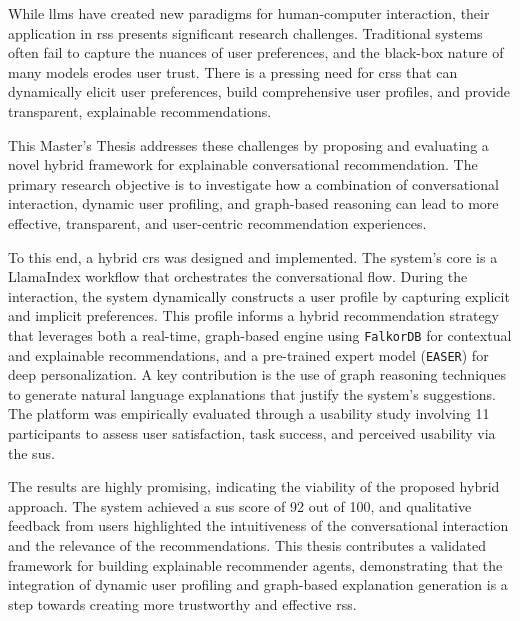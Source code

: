 
While \acp{llm} have created new paradigms for human-computer interaction, their application in \acp{rs} presents significant research challenges. Traditional systems often fail to capture the nuances of user preferences, and the black-box nature of many models erodes user trust. There is a pressing need for \aclp{crs} that can dynamically elicit user preferences, build comprehensive user profiles, and provide transparent, explainable recommendations.

This Master's Thesis addresses these challenges by proposing and evaluating a novel hybrid framework for explainable conversational recommendation. The primary research objective is to investigate how a combination of conversational interaction, dynamic user profiling, and graph-based reasoning can lead to more effective, transparent, and user-centric recommendation experiences.

To this end, a hybrid \acl{crs} was designed and implemented. The system's core is a LlamaIndex workflow that orchestrates the conversational flow. During the interaction, the system dynamically constructs a user profile by capturing explicit and implicit preferences. This profile informs a hybrid recommendation strategy that leverages both a real-time, graph-based engine using \texttt{FalkorDB} for contextual and explainable recommendations, and a pre-trained expert model (\texttt{EASER}) for deep personalization. A key contribution is the use of graph reasoning techniques to generate natural language explanations that justify the system's suggestions. The platform was empirically evaluated through a usability study involving 11 participants to assess user satisfaction, task success, and perceived usability via the \ac{sus}.

The results are highly promising, indicating the viability of the proposed hybrid approach. The system achieved a \acs{sus} score of 92 out of 100, and qualitative feedback from users highlighted the intuitiveness of the conversational interaction and the relevance of the recommendations. This thesis contributes a validated framework for building explainable recommender agents, demonstrating that the integration of dynamic user profiling and graph-based explanation generation is a step towards creating more trustworthy and effective \aclp{rs}.


